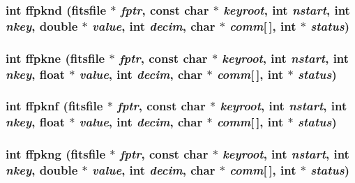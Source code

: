 \subsubsection{\setlength{\rightskip}{0pt plus 5cm}int ffpknd (\bf{fitsfile} $\ast$ {\em fptr}, const char $\ast$ {\em keyroot}, int {\em nstart}, int {\em nkey}, double $\ast$ {\em value}, int {\em decim}, char $\ast$ {\em comm}[$\,$], int $\ast$ {\em status})}\label{test_2roimasker_2fitsio_8h_9434b6e4c0a60dc83ac3faa0e1f14c7f}


\subsubsection{\setlength{\rightskip}{0pt plus 5cm}int ffpkne (\bf{fitsfile} $\ast$ {\em fptr}, const char $\ast$ {\em keyroot}, int {\em nstart}, int {\em nkey}, float $\ast$ {\em value}, int {\em decim}, char $\ast$ {\em comm}[$\,$], int $\ast$ {\em status})}\label{test_2roimasker_2fitsio_8h_652c4d9b762686c56d4be0c73bc0a7c1}


\subsubsection{\setlength{\rightskip}{0pt plus 5cm}int ffpknf (\bf{fitsfile} $\ast$ {\em fptr}, const char $\ast$ {\em keyroot}, int {\em nstart}, int {\em nkey}, float $\ast$ {\em value}, int {\em decim}, char $\ast$ {\em comm}[$\,$], int $\ast$ {\em status})}\label{test_2roimasker_2fitsio_8h_640c17ad783164b2cd324f679a4cef36}


\subsubsection{\setlength{\rightskip}{0pt plus 5cm}int ffpkng (\bf{fitsfile} $\ast$ {\em fptr}, const char $\ast$ {\em keyroot}, int {\em nstart}, int {\em nkey}, double $\ast$ {\em value}, int {\em decim}, char $\ast$ {\em comm}[$\,$], int $\ast$ {\em status})}\label{test_2roimasker_2fitsio_8h_74722d16901c4c1f0118ac23366be3ce}


